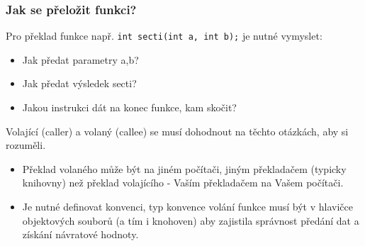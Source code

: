 \documentclass{beamer}
\begin{document}
\begin{frame}
\frametitle{Jak se přeložit funkci?}

Pro překlad funkce např. \texttt{int secti(int a, int b);} je nutné vymyslet:
\begin{itemize}
 \item Jak předat parametry a,b?
 \item Jak předat výsledek secti?
 \item Jakou instrukci dát na konec funkce, kam skočit?
\end{itemize}

Volající (caller) a volaný (callee) se musí dohodnout na těchto otázkách, aby si rozuměli.
\begin{itemize}
 \item Překlad volaného může být na jiném počítači, jiným překladačem (typicky knihovny) než překlad volajícího - Vaším překladačem na Vašem počítači.
 \item Je nutné definovat konvenci, typ konvence volání funkce musí být v hlavičce objektových souborů (a tím i knohoven) aby zajistila správnost předání dat a získání návratové hodnoty.
\end{itemize}
\end{frame}
\end{document}
